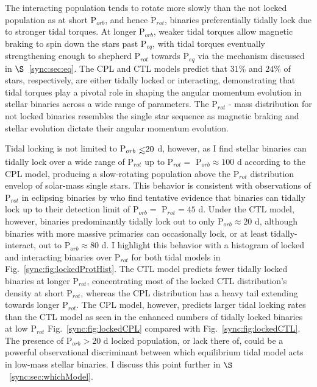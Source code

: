 The interacting population tends to rotate more slowly than the not locked population as at short P$_{orb}$, and hence P$_{rot}$, binaries preferentially tidally lock due to stronger tidal torques.  At longer P$_{orb}$, weaker tidal torques allow magnetic braking to spin down the stars past P$_{eq}$, with tidal torques eventually strengthening enough to shepherd P$_{rot}$ towards P$_{eq}$ via the mechanism discussed in $\S$~\ref{sync:sec:eq}. The CPL and CTL models predict that $31\%$ and $24\%$ of stars, respectively, are either tidally locked or interacting, demonstrating that tidal torques play a pivotal role in shaping the angular momentum evolution in stellar binaries across a wide range of parameters. The P$_{rot}$ - mass distribution for not locked binaries resembles the single star sequence as magnetic braking and stellar evolution dictate their angular momentum evolution.

Tidal locking is not limited to P$_{orb} \lsim 20$ d, however, as I find stellar binaries can tidally lock over a wide range of P$_{rot}$ up to P$_{rot} =$ P$_{orb} \approx 100$ d according to the CPL model, producing a slow-rotating population above the P$_{rot}$ distribution envelop of solar-mass single stars. This behavior is consistent with observations of P$_{rot}$ in \kepler eclipsing binaries by \citet{Lurie2017} who find tentative evidence that binaries can tidally lock up to their detection limit of P$_{orb} = $ P$_{rot} = 45$ d. Under the CTL model, however, binaries predominantly tidally lock out to only P$_{orb} \approx 20$ d, although binaries with more massive primaries can occasionally lock, or at least tidally-interact, out to P$_{orb} \approx 80$ d. I highlight this behavior with a histogram of locked and interacting binaries over P$_{rot}$ for both tidal models in Fig.~\ref{sync:fig:lockedProtHist}. The CTL model predicts fewer tidally locked binaries at longer P$_{rot}$, concentrating most of the locked CTL distribution's density at short P$_{rot}$, whereas the CPL distribution has a heavy tail extending towards longer P$_{rot}$. The CPL model, however, predicts larger tidal locking rates than the CTL model as seen in the enhanced numbers of tidally locked binaries at low P$_{rot}$ Fig.~\ref{sync:fig:lockedCPL} compared with Fig.~\ref{sync:fig:lockedCTL}. The presence of P$_{orb} > 20$ d locked population, or lack there of, could be a powerful observational discriminant between which equilibrium tidal model acts in low-mass stellar binaries. I discuss this point further in $\S$~\ref{sync:sec:whichModel}. 

